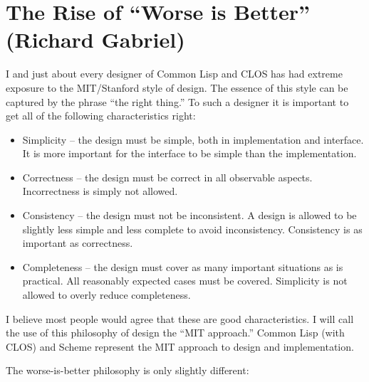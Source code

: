 \documentclass[10pt,twoside,openright]{memoir}
\begin{document}
\chapter{The Rise of ``Worse is Better'' (Richard Gabriel)}

I and just about every designer of Common Lisp and CLOS has had extreme exposure to the MIT/Stanford style of design. The essence of this style can be captured by the phrase ``the right thing.'' To such a designer it is important to get all of the following characteristics right:

\begin{itemize}  
\item Simplicity -- the design must be simple, both in implementation and interface. It is more important for the interface to be simple than the implementation.
\item Correctness -- the design must be correct in all observable aspects. Incorrectness is simply not allowed.
\item Consistency -- the design must not be inconsistent. A design is allowed to be slightly less simple and less complete to avoid inconsistency. Consistency is as important as correctness.
\item Completeness -- the design must cover as many important situations as is practical. All reasonably expected cases must be covered. Simplicity is not allowed to overly reduce completeness.
\end{itemize}
I believe most people would agree that these are good characteristics. I will call the use of this philosophy of design the ``MIT approach.'' Common Lisp (with CLOS) and Scheme represent the MIT approach to design and implementation.

The worse-is-better philosophy is only slightly different:
\end{document}
